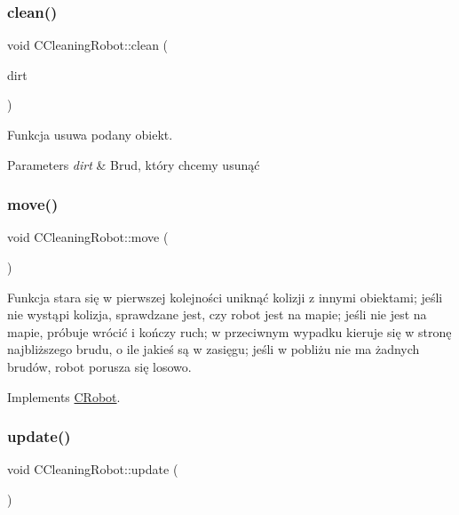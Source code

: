 \subsubsection{\texorpdfstring{clean()}{clean()}}
{\footnotesize\ttfamily void C\+Cleaning\+Robot\+::clean (\begin{DoxyParamCaption}\item[{\mbox{\hyperlink{class_c_dirt}{C\+Dirt}} $\ast$}]{dirt }\end{DoxyParamCaption})}



Funkcja usuwa podany obiekt. 


\begin{DoxyParams}{Parameters}
{\em dirt} & Brud, który chcemy usunąć \\
\hline
\end{DoxyParams}
\mbox{\label{class_c_cleaning_robot_a1ad227a5f3508a8e78fcecae7d3de53b}} 
\subsubsection{\texorpdfstring{move()}{move()}}
{\footnotesize\ttfamily void C\+Cleaning\+Robot\+::move (\begin{DoxyParamCaption}{ }\end{DoxyParamCaption})\hspace{0.3cm}{\ttfamily [virtual]}}



Funkcja stara się w pierwszej kolejności uniknąć kolizji z innymi obiektami; jeśli nie wystąpi kolizja, sprawdzane jest, czy robot jest na mapie; jeśli nie jest na mapie, próbuje wrócić i kończy ruch; w przeciwnym wypadku kieruje się w stronę najbliższego brudu, o ile jakieś są w zasięgu; jeśli w pobliżu nie ma żadnych brudów, robot porusza się losowo. 



Implements \mbox{\hyperlink{class_c_robot_a1de9be879213eadf7ded27caedb84598}{C\+Robot}}.

\mbox{\label{class_c_cleaning_robot_afd8b3a58abfc91ebdce32af3686c5e9f}} 
\subsubsection{\texorpdfstring{update()}{update()}}
{\footnotesize\ttfamily void C\+Cleaning\+Robot\+::update (\begin{DoxyParamCaption}{ }\end{DoxyParamCaption})\hspace{0.3cm}{\ttfamily [virtual]}}



